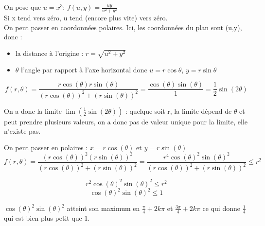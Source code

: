 
\begin{solution}
    On pose que $u = x^3$:
    $f(u,y) = \frac{u y}{u^2 + y^2}$ \\
    Si x tend vers zéro, u tend (encore plus vite) vers zéro. \\
    On peut passer en coordonnées polaires. Ici, les coordonnées du plan sont  (u,y), donc :
    \begin{itemize}
        \item la distance à l’origine : $r = \sqrt{u^2 + y^2}$
        \item $\theta$ l'angle par rapport à l’axe horizontal donc $u=r \cos \theta$, $y=r \sin \theta$
    \end{itemize}
    \[
    f(r, \theta) = \frac{r \cos(\theta) r \sin(\theta)}{(r \cos(\theta))^2 + (r \sin(\theta))^2} = \frac{\cos(\theta)\sin(\theta)}{1} = \frac{1}{2} \sin(2\theta)
    \]
    
    On a donc la limite $\displaystyle\lim (\frac{1}{2} \sin(2\theta))$ : quelque soit r, la limite dépend de $\theta$ et peut prendre plusieurs valeurs, on a donc pas de valeur unique pour la limite, elle n'existe pas.
\end{solution}

\begin{solution}
    On peut passer en polaires : $x = r \cos(\theta)$ et $y = r \sin(\theta)$ \\
    \begin{equation}
        f(r, \theta) = \frac{(r \cos(\theta))^2 (r \sin(\theta))^2}{(r \cos(\theta))^2 + (r \sin(\theta))^2} = \frac{r^4 \cos(\theta)^2\sin(\theta)^2}{(r \cos(\theta))^2 + (r \sin(\theta))^2} \leq r^2 
    \end{equation}

    \begin{equation}
        r^2 \cos(\theta)^2 \sin(\theta)^2 \leq r^2
    \end{equation}
    \begin{equation}
        \cos(\theta)^2 \sin(\theta)^2 \leq 1
    \end{equation}
    
    $\cos(\theta)^2 \sin(\theta)^2$ atteint son maximum en $\frac{\pi}{4} + 2k\pi$ et $\frac{3\pi}{4} + 2k\pi$ ce qui donne $\frac{1}{4}$ qui est bien plus petit que 1. 
\end{solution}

